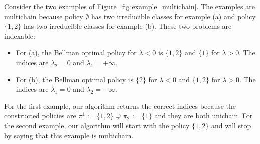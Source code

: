 Consider the two examples of Figure~\ref{fig:example_multichain}. The examples are multichain because policy $\emptyset$ has two irreducible classes for example (a) and policy $\{1,2\}$ has two irreducible classes for example (b). These two problems are indexable:
\begin{itemize}
    \item For (a), the Bellman optimal policy for $\lambda<0$ is $\{1,2\}$ and $\{1\}$ for $\lambda>0$. The indices are $\lambda_2=0$ and $\lambda_1=+\infty$.
    \item For (b), the  Bellman optimal policy is $\{2\}$ for $\lambda<0$  and $\{1,2\}$ for $\lambda>0$. The indices are $\lambda_1=0$ and $\lambda_2=-\infty$.
\end{itemize}
For the first example, our algorithm returns the correct indices because the constructed policies are $\pi^1:=\{1,2\}\supsetneq\pi_2:=\{1\}$ and they are both unichain.  For the second example, our algorithm will start with the policy $\{1,2\}$ and will stop by saying that this example is multichain.

\endgroup
